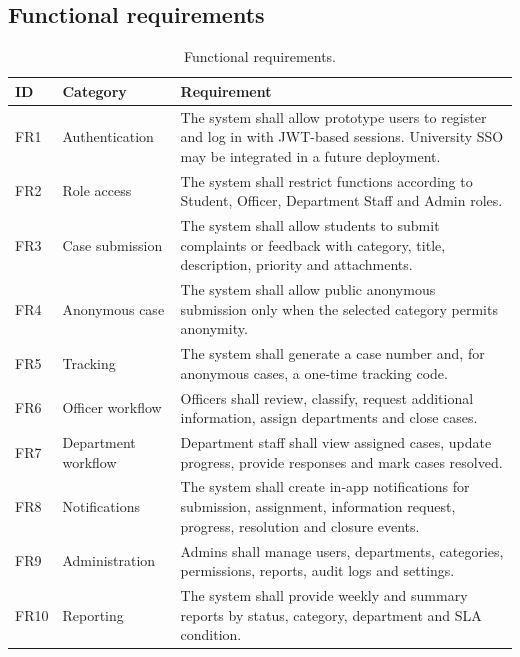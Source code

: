\documentclass[11pt,a4paper]{article}
\begin{document}
\subsection{Functional requirements}
\begin{table}[H]
\centering
\small
\begin{tabularx}{\textwidth}{p{}p{}Y}
\toprule
ID & Category & Requirement\\
\midrule
FR1 & Authentication & The system shall allow prototype users to register and log in with JWT-based sessions. University SSO may be integrated in a future deployment.\\
FR2 & Role access & The system shall restrict functions according to Student, Officer, Department Staff and Admin roles.\\
FR3 & Case submission & The system shall allow students to submit complaints or feedback with category, title, description, priority and attachments.\\
FR4 & Anonymous case & The system shall allow public anonymous submission only when the selected category permits anonymity.\\
FR5 & Tracking & The system shall generate a case number and, for anonymous cases, a one-time tracking code.\\
FR6 & Officer workflow & Officers shall review, classify, request additional information, assign departments and close cases.\\
FR7 & Department workflow & Department staff shall view assigned cases, update progress, provide responses and mark cases resolved.\\
FR8 & Notifications & The system shall create in-app notifications for submission, assignment, information request, progress, resolution and closure events.\\
FR9 & Administration & Admins shall manage users, departments, categories, permissions, reports, audit logs and settings.\\
FR10 & Reporting & The system shall provide weekly and summary reports by status, category, department and SLA condition.\\
\bottomrule
\end{tabularx}
\caption{Functional requirements.}
\end{table}
\end{document}
